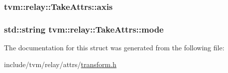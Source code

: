\subsubsection[{\texorpdfstring{axis}{axis}}]{ tvm\+::relay\+::\+Take\+Attrs\+::axis}\hypertarget{structtvm_1_1relay_1_1TakeAttrs_a5d4f821c5541cb9deb71d835b144cb22}{}\label{structtvm_1_1relay_1_1TakeAttrs_a5d4f821c5541cb9deb71d835b144cb22}
\subsubsection[{\texorpdfstring{mode}{mode}}]{\setlength{\rightskip}{0pt plus 5cm}std\+::string tvm\+::relay\+::\+Take\+Attrs\+::mode}\hypertarget{structtvm_1_1relay_1_1TakeAttrs_ac7fd604371e248cce170a05be605bd43}{}\label{structtvm_1_1relay_1_1TakeAttrs_ac7fd604371e248cce170a05be605bd43}


The documentation for this struct was generated from the following file\+:\begin{DoxyCompactItemize}
\item 
include/tvm/relay/attrs/\hyperlink{include_2tvm_2relay_2attrs_2transform_8h}{transform.\+h}\end{DoxyCompactItemize}
